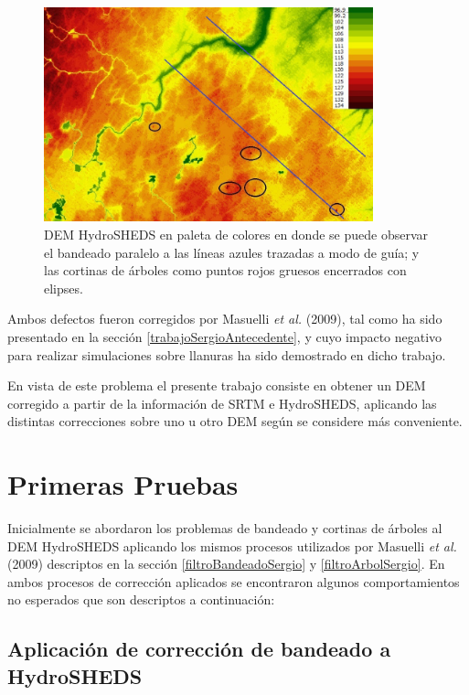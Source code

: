 \documentclass[10pt,a4paper, twoside]{report}
\begin{document}
\begin{figure}[!htb]
   \centering      
   \includegraphics[width=0.85\textwidth]{imagenes/HSHEDSPaleta_2.jpg}
 \caption{DEM HydroSHEDS en paleta de colores en donde se puede observar el bandeado paralelo a las líneas azules trazadas a modo de guía; y las cortinas de árboles como puntos rojos gruesos encerrados con elipses.}
 \label{HSHEDSPaleta}
\end{figure}

Ambos defectos fueron corregidos por Masuelli \textit{et al.} (2009), tal como ha sido presentado en la sección \ref{trabajoSergioAntecedente}, y cuyo impacto negativo para realizar simulaciones sobre llanuras ha sido demostrado en dicho trabajo.

En vista de este problema el presente trabajo consiste en obtener un DEM corregido a partir de la información de SRTM e HydroSHEDS, aplicando las distintas correcciones sobre uno u otro DEM según se considere más conveniente.

\section{Primeras Pruebas}

Inicialmente se abordaron los problemas de bandeado y cortinas de árboles al DEM HydroSHEDS aplicando los mismos procesos utilizados por Masuelli \textit{et al.} (2009) descriptos en la sección \ref{filtroBandeadoSergio} y \ref{filtroArbolSergio}. En ambos procesos de corrección aplicados se encontraron algunos comportamientos no esperados que son descriptos a continuación:

\subsection{Aplicación de corrección de bandeado a HydroSHEDS}
\label{aplicacionBandeado}
\end{document}
